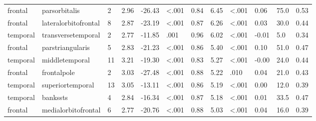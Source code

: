 \documentclass{article}
\begin{document}
\begin{longtable}{llR{1.5cm}R{1cm}R{1.3cm}R{1cm}R{1cm}R{1.3cm}R{1cm}R{1.8cm}R{1.3cm}R{1.8cm}}
\bottomrule
\endlastfoot
   frontal &             parsorbitalis &            2 &                  2.96 &           -26.43 &      \textless.001 &                               0.84 &                          6.45 &                   \textless.001 &  0.06 &   75.0 &      0.53 \\
   frontal &      lateralorbitofrontal &            8 &                  2.87 &           -23.19 &      \textless.001 &                               0.87 &                          6.26 &                   \textless.001 &  0.03 &   30.0 &      0.44 \\
  temporal &        transversetemporal &            2 &                  2.77 &           -11.85 &               .001 &                               0.96 &                          6.02 &                   \textless.001 & -0.01 &    5.0 &      0.34 \\
   frontal &          parstriangularis &            5 &                  2.83 &           -21.23 &      \textless.001 &                               0.86 &                          5.40 &                   \textless.001 &  0.10 &   51.0 &      0.47 \\
  temporal &            middletemporal &           11 &                  3.21 &           -19.30 &      \textless.001 &                               0.83 &                          5.27 &                   \textless.001 & -0.00 &   24.0 &      0.44 \\
   frontal &               frontalpole &            2 &                  3.03 &           -27.48 &      \textless.001 &                               0.88 &                          5.22 &                            .010 &  0.04 &   21.0 &      0.43 \\
  temporal &          superiortemporal &           13 &                  3.05 &           -13.11 &      \textless.001 &                               0.86 &                          5.19 &                   \textless.001 &  0.00 &   12.0 &      0.39 \\
  temporal &                  bankssts &            4 &                  2.84 &           -16.34 &      \textless.001 &                               0.87 &                          5.18 &                   \textless.001 &  0.01 &   33.5 &      0.47 \\
   frontal &       medialorbitofrontal &            6 &                  2.77 &           -20.76 &      \textless.001 &                               0.88 &                          5.03 &                   \textless.001 &  0.04 &   16.0 &      0.39 \\

\end{longtable}
\end{document}
